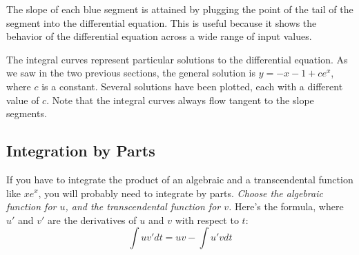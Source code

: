 The slope of each blue segment is attained by plugging the point of the tail of the segment into the differential equation. This is useful because it shows the behavior of the differential equation across a wide range of input values.

The integral curves represent particular solutions to the differential equation. As we saw in the two previous sections, the general solution is $y = -x - 1 + ce^{x}$, where $c$ is a constant. Several solutions have been plotted, each with a different value of $c$. Note that the integral curves always flow tangent to the slope segments.

\begin{center}
\end{center}

\subsection{Integration by Parts}
If you have to integrate the product of an algebraic and a transcendental function like $xe^{x}$, you will probably need to integrate by parts. \textit{Choose the algebraic function for $u$, and the transcendental function for $v$.} Here's the formula, where $u'$ and $v'$ are the derivatives of $u$ and $v$ with respect to $t$:
$$\int uv'dt = uv - \int u'vdt$$

